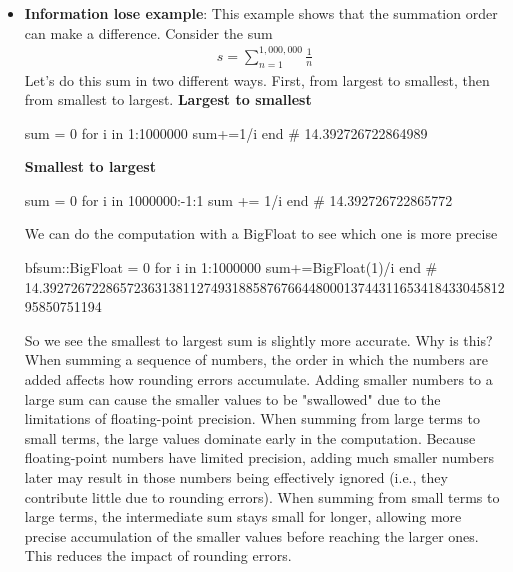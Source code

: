 \documentclass{report}
\begin{document}
\begin{itemize}
\begin{enumerate}
                \end{enumerate}
        \item \textbf{Information lose example}: This example shows that the summation order can make a difference. Consider the sum
            \begin{align*}
                s =\sum_{n=1}^{1,000,000} \frac{1}{n}
            \end{align*}
            Let's do this sum in two different ways. First, from largest to smallest, then from smallest to largest.
            \bigbreak \noindent 
            \textbf{Largest to smallest}
            \bigbreak \noindent 
            \begin{pythoncode}
                sum = 0
                for i in 1:1000000
                    sum+=1/i
                end
                # 14.392726722864989
            \end{pythoncode}
            \bigbreak \noindent 
            \textbf{Smallest to largest}
            \bigbreak \noindent 
            \begin{pythoncode}
            sum = 0
            for i in 1000000:-1:1
                sum += 1/i
            end
            # 14.392726722865772
            \end{pythoncode}
            \bigbreak \noindent 
            We can do the computation with a BigFloat to see which one is more precise
            \bigbreak \noindent 
            \begin{jlcode}
            bfsum::BigFloat = 0
            for i in 1:1000000
                sum+=BigFloat(1)/i
            end
            # 14.39272672286572363138112749318858767664480001374431165341843304581295850751194
            \end{jlcode}
            \bigbreak \noindent 
            So we see the smallest to largest sum is slightly more accurate. Why is this? When summing a sequence of numbers, the order in which the numbers are added affects how rounding errors accumulate. Adding smaller numbers to a large sum can cause the smaller values to be "swallowed" due to the limitations of floating-point precision.
            \bigbreak \noindent 
            When summing from large terms to small terms, the large values dominate early in the computation. Because floating-point numbers have limited precision, adding much smaller numbers later may result in those numbers being effectively ignored (i.e., they contribute little due to rounding errors).
            \bigbreak \noindent 
            When summing from small terms to large terms, the intermediate sum stays small for longer, allowing more precise accumulation of the smaller values before reaching the larger ones. This reduces the impact of rounding errors.

\end{itemize}
\end{document}
